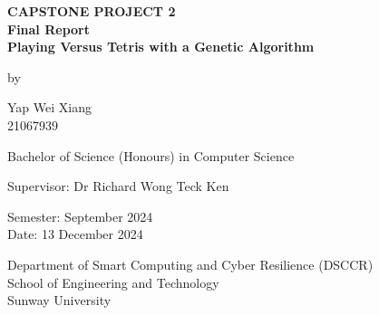 \documentclass[a4paper, 12pt]{extreport}
\begin{document}
	\begin{titlepage}
		
		\centering
		
		\vspace{.5cm}
		
		\begin{center}
			\textbf{\large CAPSTONE PROJECT 2} \\
			\textbf{\large Final Report} \\
			\vspace{1cm}
			\textbf{\large Playing Versus Tetris with a Genetic Algorithm}
			
			\vspace{1cm}
			
			by
			
			\vspace{1cm}
			
			\large Yap Wei Xiang \\
			21067939
			
			\vspace{1cm}
			
			Bachelor of Science (Honours) in Computer Science
			
			\vspace{1cm}
			
			\large Supervisor: Dr Richard Wong Teck Ken
			
			\vspace{1cm}
			
			\normalsize Semester: September 2024 \\
			Date: 13 December 2024
			
			\vfill
			
			Department of Smart Computing and Cyber Resilience (DSCCR)\\
			School of Engineering and Technology\\
			Sunway University
		\end{center}
		
	\end{titlepage}
	
\end{document}
